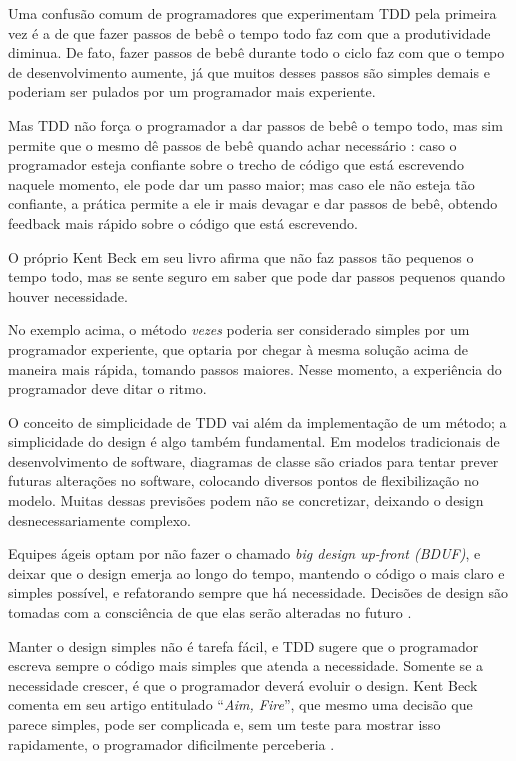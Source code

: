 Uma confusão comum de programadores que experimentam TDD pela primeira vez é a
de que fazer passos de bebê o tempo todo faz com que a produtividade diminua.
De fato, fazer passos de bebê durante todo o ciclo faz com que o tempo de
desenvolvimento aumente, já que muitos desses passos são simples demais e
poderiam ser pulados por um programador mais experiente. 

Mas TDD não força o programador a dar passos de bebê o tempo todo, mas sim
permite que o mesmo dê passos de bebê quando achar necessário
\cite{TDDByExample}: caso o programador esteja confiante sobre o trecho de
código  que está escrevendo naquele momento, ele pode dar um passo maior;  mas
caso ele não esteja tão confiante, a prática permite a ele ir mais devagar e 
dar passos de bebê, obtendo feedback mais rápido sobre o código que está
escrevendo.

O próprio Kent Beck em seu livro afirma que não faz passos tão pequenos o tempo
todo, mas se sente seguro em saber que pode dar passos pequenos quando houver
necessidade.

No exemplo acima, o método \textit{vezes} poderia ser considerado simples por
um programador experiente, que optaria por chegar à mesma solução acima de
maneira mais rápida, tomando passos maiores. Nesse momento, a experiência do
programador deve ditar o ritmo.

O conceito de simplicidade de TDD vai além da implementação de um método; a
simplicidade do design é algo também fundamental. Em modelos tradicionais de
desenvolvimento de software, diagramas de classe são criados para tentar prever
futuras alterações no software, colocando diversos pontos de flexibilização no
modelo. Muitas dessas previsões podem não se concretizar, deixando o design
desnecessariamente complexo.

Equipes ágeis optam por não fazer o chamado \textit{big design up-front (BDUF)},
e deixar que o design emerja ao longo do tempo, mantendo o código o mais claro e
simples possível, e refatorando sempre que há necessidade. Decisões de
design são tomadas com a consciência de que elas serão alteradas no futuro
\cite{is-design-dead}.

Manter o design simples não é tarefa fácil, e TDD sugere que o programador
escreva sempre o código mais simples que atenda a necessidade. Somente se a
necessidade crescer, é que o programador deverá evoluir o design. Kent Beck
comenta em seu artigo entitulado ``\textit{Aim, Fire}'', que mesmo uma decisão que
parece simples, pode ser complicada e, sem um teste para mostrar isso rapidamente, o
programador dificilmente perceberia \cite{aim-fire}. 

